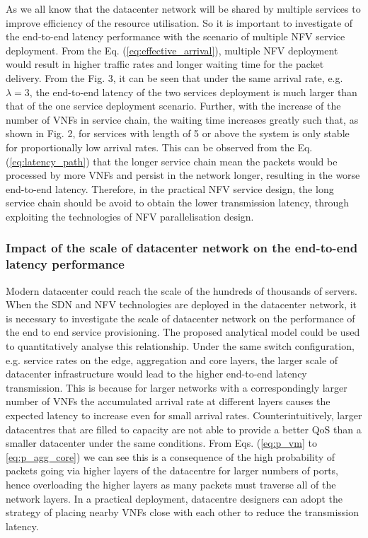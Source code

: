 As we all know that the datacenter network will be shared by multiple services to improve efficiency of the resource utilisation. So it is important to investigate of the end-to-end latency performance with the scenario of multiple NFV service deployment. From the Eq. (\ref{eq:effective_arrival}), multiple NFV deployment would result in higher traffic rates and longer waiting time for the packet delivery. From the Fig. 3, it can be seen that under the same arrival rate, e.g. $\lambda=3$, the end-to-end latency of the two services deployment is much larger than that of the one service deployment scenario. Further, with the increase of the number of VNFs in service chain, the waiting time increases greatly such that, as shown in Fig. 2, for services with length of 5 or above the system is only stable for proportionally low arrival rates. This can be observed from the Eq. (\ref{eq:latency_path}) that the longer service chain mean the packets would be processed by more VNFs and persist in the network longer, resulting in the worse end-to-end latency. Therefore, in the practical NFV service design, the long service chain should be avoid to obtain the lower transmission latency, through exploiting the technologies of NFV parallelisation design.

\subsubsection{Impact of the scale of datacenter network on the end-to-end latency performance}

Modern datacenter could reach the scale of the hundreds of thousands of servers. When the SDN and NFV technologies are deployed in the datacenter network, it is necessary to investigate the scale of datacenter network on the performance of the end to end service provisioning.  The proposed analytical model could be used to quantitatively analyse this relationship. Under the same switch configuration, e.g. service rates on the edge, aggregation and core layers, the larger scale of datacenter infrastructure would lead to the higher end-to-end latency transmission. This is because for larger networks with a correspondingly larger number of VNFs the accumulated arrival rate at different layers causes the expected latency to increase even for small arrival rates. Counterintuitively, larger datacentres that are filled to capacity are not able to provide a better QoS than a smaller datacenter under the same conditions. From Eqs. (\ref{eq:p_vm} to \ref{eq:p_agg_core}) we can see this is a consequence of the high probability of packets going via higher layers of the datacentre for larger numbers of ports, hence overloading the higher layers as many packets must traverse all of the network layers. In a practical deployment, datacentre designers can adopt the strategy of placing nearby VNFs close with each other to reduce the transmission latency.


